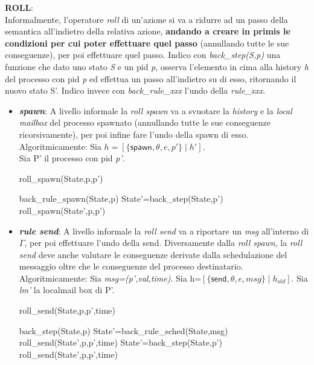 \documentclass[background.tex]{subfiles}
\begin{document}
\textbf{ROLL}:\\
	Informalmente, l'operatore \textit{roll} di un'azione si va a ridurre ad un passo della semantica all'indietro della relativa azione, \textbf{andando a creare in primis le condizioni per cui poter effettuare quel passo} (annullando tutte le sue conseguenze), per poi effettuare quel passo.
	Indico con \textit{back\_step(S,p)} una funzione che dato uno stato \textit{S} e un pid \textit{p}, osserva l'elemento in cima alla history \textit{h} del processo con pid \textit{p} ed effettua un passo all'indietro su di esso, ritornando il nuovo stato S'.
	Indico invece con \textit{back\_rule\_xxx} l'undo della \textit{rule\_xxx}.
	\begin{itemize}
		\item \textit{\textbf{spawn}}: A livello informale la \textit{roll spawn} va a svuotare la \textit{history} e la \textit{local mailbox} del processo spawnato (annullando tutte le sue conseguenze ricorsivamente), per poi infine fare l'undo della spawn di esso. Algoritmicamente:
		Sia $\displaystyle h=[\{\mathsf{spawn},\theta,e,p'\} \mid h']$.\\
		Sia P' il processo con pid \textit{p'}.
		\begin{algorithm}[H]
		\caption{roll\_spawn(State,p,p')}
		\begin{algorithmic}
			\RETURN back\_rule\_spawn(State,p)
		\ELSE
			\STATE State'=back\_step(State,p')
			\RETURN roll\_spawn(State',p,p')
		\ENDIF
		\end{algorithmic}
		\end{algorithm}
		\item \textit{\textbf{rule send}}: 
		A livello informale la \textit{roll send} va a riportare un \textit{msg} all'interno di $\Gamma$, per poi effettuare l'undo della send. Diversamente dalla \textit{roll spawn}, la \textit{roll send} deve anche valutare le conseguenze derivate dalla schedulazione del messaggio oltre che le conseguenze del processo destinatario. Algoritmicamente:
		Sia \textit{msg=(p',val,time)}.
		Sia h=$\displaystyle [\{\mathsf{send},\theta,e,msg\} \mid h_{old}]$.
		Sia \textit{lm'} la localmail box di P'.
		\begin{algorithm}[H]
		\caption{roll\_send(State,p,p',time)}
		\begin{algorithmic}
		\IF { msg $\in$ $\Gamma$} 
			\RETURN back\_step(State,p)
		\ELSE
			\IF { lm'==[msg $\mid$ $lm_{rest}$]} 
				\STATE State'=back\_rule\_sched(State,msg)
				\RETURN roll\_send(State',p,p',time)
			\ELSE
				\STATE State'=back\_step(State,p')
				\RETURN roll\_send(State',p,p',time)
			\ENDIF
		\ENDIF
		\end{algorithmic}
		\end{algorithm}
	\end{itemize}
\end{document}

